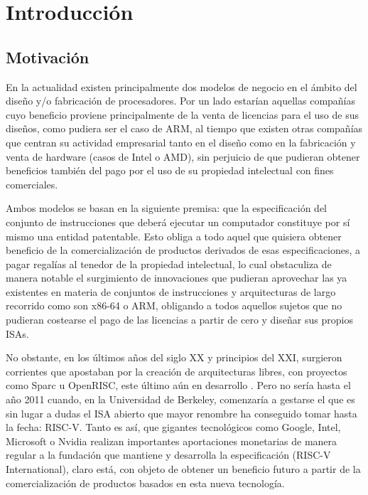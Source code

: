 \chapter{Introducción}


\section{Motivación}

En la actualidad existen principalmente dos modelos de negocio en el ámbito del diseño y/o fabricación de procesadores. Por un lado estarían aquellas compañías cuyo beneficio proviene principalmente de la venta de licencias para el uso de sus diseños, como pudiera ser el caso de ARM, al tiempo que existen otras compañías que centran su actividad empresarial tanto en el diseño como en la fabricación y venta de hardware (casos de Intel o AMD), sin perjuicio de que pudieran obtener beneficios también del pago por el uso de su propiedad intelectual con fines comerciales.

Ambos modelos se basan en la siguiente premisa: que la especificación del conjunto de instrucciones que deberá ejecutar un computador constituye por sí mismo una entidad patentable. Esto obliga a todo aquel que quisiera obtener beneficio de la comercialización de productos derivados de esas especificaciones, a pagar regalías al tenedor de la propiedad intelectual, lo cual obstaculiza de manera notable el surgimiento de innovaciones que pudieran aprovechar las ya existentes en materia de conjuntos de instrucciones y arquitecturas de largo recorrido como son x86-64 o ARM, obligando a todos aquellos sujetos que no pudieran costearse el pago de las licencias a partir de cero y diseñar sus propios ISAs.

No obstante, en los últimos años del siglo XX y principios del XXI, surgieron corrientes que apostaban por la creación de arquitecturas libres, con proyectos como Sparc u OpenRISC, este último aún en desarrollo \cite{openrisc}. Pero no sería hasta el año 2011 \cite{geneology} cuando, en la Universidad de Berkeley, comenzaría a gestarse el que es sin lugar a dudas el ISA abierto que mayor renombre ha conseguido tomar hasta la fecha: RISC-V. Tanto es así, que gigantes tecnológicos como Google, Intel, Microsoft o Nvidia \cite{partners} realizan importantes aportaciones monetarias de manera regular a la fundación que mantiene y desarrolla la especificación (RISC-V International), claro está, con objeto de obtener un beneficio futuro a partir de la comercialización de productos basados en esta nueva tecnología.

